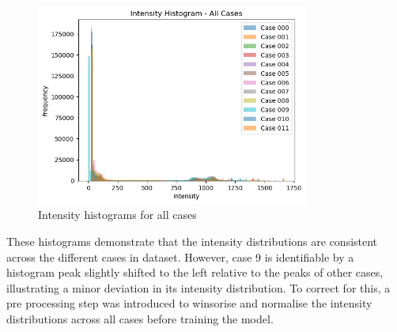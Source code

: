 \documentclass[11pt]{article}
\begin{document}
\begin{figure}[H]
    \centering
    \includegraphics[width=0.8\textwidth]{figs/intensity_hist.png}
    \caption{Intensity histograms for all cases}
    \label{fig:intensity_histograms}
\end{figure}

These histograms demonstrate that the intensity distributions are consistent across the different cases in dataset. However, case 9 is identifiable by a histogram peak slightly shifted to the left relative to the peaks of other cases, illustrating a minor deviation in its intensity distribution. To correct for this, a pre processing step was introduced to winsorise and normalise the intensity distributions across all cases before training the model.
\end{document}

